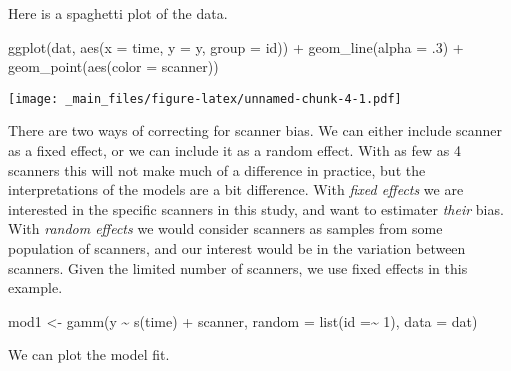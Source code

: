 \documentclass[
]{book}
\newenvironment{Shaded}{\begin{snugshade}}{\end{snugshade}}
\newcommand{\AttributeTok}[1]{\textcolor[rgb]{0.77,0.63,0.00}{#1}}
\newcommand{\DecValTok}[1]{\textcolor[rgb]{0.00,0.00,0.81}{#1}}
\newcommand{\FunctionTok}[1]{\textcolor[rgb]{0.00,0.00,0.00}{#1}}
\newcommand{\NormalTok}[1]{#1}
\newcommand{\OtherTok}[1]{\textcolor[rgb]{0.56,0.35,0.01}{#1}}
\newcommand{\SpecialCharTok}[1]{\textcolor[rgb]{0.00,0.00,0.00}{#1}}
\begin{document}
Here is a spaghetti plot of the data.

\begin{Shaded}
\begin{Highlighting}[]
\FunctionTok{ggplot}\NormalTok{(dat, }\FunctionTok{aes}\NormalTok{(}\AttributeTok{x =}\NormalTok{ time, }\AttributeTok{y =}\NormalTok{ y, }\AttributeTok{group =}\NormalTok{ id)) }\SpecialCharTok{+} 
  \FunctionTok{geom\_line}\NormalTok{(}\AttributeTok{alpha =}\NormalTok{ .}\DecValTok{3}\NormalTok{) }\SpecialCharTok{+} 
  \FunctionTok{geom\_point}\NormalTok{(}\FunctionTok{aes}\NormalTok{(}\AttributeTok{color =}\NormalTok{ scanner))}
\end{Highlighting}
\end{Shaded}

\texttt{[image: \_main\_files/figure-latex/unnamed-chunk-4-1.pdf]}

There are two ways of correcting for scanner bias. We can either include scanner as a fixed effect, or we can include it as a random effect. With as few as 4 scanners this will not make much of a difference in practice, but the interpretations of the models are a bit difference. With \emph{fixed effects} we are interested in the specific scanners in this study, and want to estimater \emph{their} bias. With \emph{random effects} we would consider scanners as samples from some population of scanners, and our interest would be in the variation between scanners. Given the limited number of scanners, we use fixed effects in this example.

\begin{Shaded}
\begin{Highlighting}[]
\NormalTok{mod1 }\OtherTok{\textless{}{-}} \FunctionTok{gamm}\NormalTok{(y }\SpecialCharTok{\textasciitilde{}} \FunctionTok{s}\NormalTok{(time) }\SpecialCharTok{+}\NormalTok{ scanner, }\AttributeTok{random =} \FunctionTok{list}\NormalTok{(}\AttributeTok{id =}\SpecialCharTok{\textasciitilde{}} \DecValTok{1}\NormalTok{), }
             \AttributeTok{data =}\NormalTok{ dat)}
\end{Highlighting}
\end{Shaded}

We can plot the model fit.

\begin{Shaded}
\end{Shaded}
\end{document}
